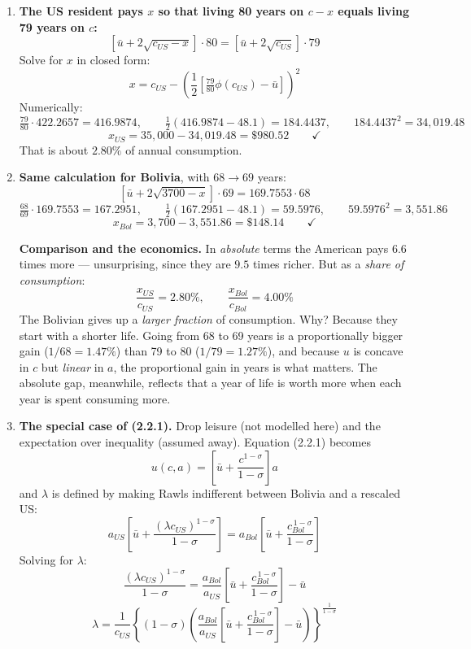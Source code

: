 \documentclass[12pt, letterpaper]{article}
\begin{document}
\begin{tcolorbox}[evenbox,title={Problem 2.6 \quad The Value of Life Expectancy}]
\begin{enumerate}

\item \textbf{The US resident pays $x$ so that living 80 years on $c-x$ equals living 79
years on $c$:}
$$\left[\bar u + 2\sqrt{c_{US}-x}\right] \cdot 80 = \left[\bar u + 2\sqrt{c_{US}}\right]\cdot 79$$
Solve for $x$ in closed form:
$$x = c_{US} - \left(\frac{1}{2}\left[\tfrac{79}{80}\phi(c_{US}) - \bar u\right]\right)^{2}$$
Numerically:
$$\tfrac{79}{80}\cdot 422.2657 = 416.9874,\qquad
\tfrac{1}{2}(416.9874 - 48.1) = 184.4437,\qquad 184.4437^2 = 34{,}019.48$$
$$\boxed{x_{US} = 35{,}000 - 34{,}019.48 = \$980.52} \qquad \checkmark$$
That is about $2.80\%$ of annual consumption.

\item \textbf{Same calculation for Bolivia}, with $68 \to 69$ years:
$$\left[\bar u + 2\sqrt{3700-x}\right]\cdot 69 = 169.7553 \cdot 68$$
$$\tfrac{68}{69}\cdot 169.7553 = 167.2951,\qquad \tfrac{1}{2}(167.2951-48.1) = 59.5976,
\qquad 59.5976^2 = 3{,}551.86$$
$$\boxed{x_{Bol} = 3{,}700 - 3{,}551.86 = \$148.14} \qquad \checkmark$$

\textbf{Comparison and the economics.} In \emph{absolute} terms the American pays $6.6$ times
more --- unsurprising, since they are $9.5$ times richer. But as a \emph{share of
consumption}:
$$\frac{x_{US}}{c_{US}} = 2.80\%, \qquad \frac{x_{Bol}}{c_{Bol}} = 4.00\%$$
The Bolivian gives up a \emph{larger fraction} of consumption. Why? Because they start with
a shorter life. Going from 68 to 69 years is a proportionally bigger gain
($1/68 = 1.47\%$) than 79 to 80 ($1/79 = 1.27\%$), and because $u$ is concave in $c$ but
\emph{linear} in $a$, the proportional gain in years is what matters. The absolute gap,
meanwhile, reflects that a year of life is worth more when each year is spent consuming more.

\item \textbf{The special case of (2.2.1).} Drop leisure (not modelled here) and the
expectation over inequality (assumed away). Equation (2.2.1) becomes
$$u(c,a) = \left[\bar u + \frac{c^{1-\sigma}}{1-\sigma}\right]a$$
and $\lambda$ is defined by making Rawls indifferent between Bolivia and a rescaled US:
$$\boxed{\;a_{US}\left[\bar u + \frac{(\lambda c_{US})^{1-\sigma}}{1-\sigma}\right]
= a_{Bol}\left[\bar u + \frac{c_{Bol}^{\,1-\sigma}}{1-\sigma}\right]\;}$$
Solving for $\lambda$:
$$\frac{(\lambda c_{US})^{1-\sigma}}{1-\sigma}
= \frac{a_{Bol}}{a_{US}}\left[\bar u + \frac{c_{Bol}^{\,1-\sigma}}{1-\sigma}\right] - \bar u$$
$$\boxed{\;\lambda = \frac{1}{c_{US}}\left\{(1-\sigma)\left(\frac{a_{Bol}}{a_{US}}
\left[\bar u + \frac{c_{Bol}^{\,1-\sigma}}{1-\sigma}\right] - \bar u\right)\right\}^{\frac{1}{1-\sigma}}\;}$$


\end{enumerate}
\end{tcolorbox}
\end{document}
